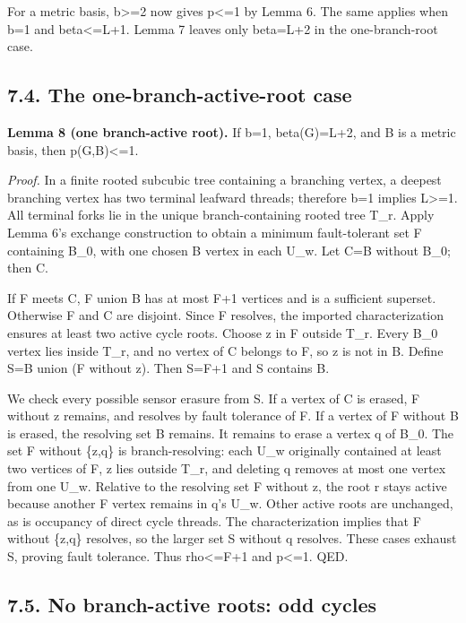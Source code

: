 \documentclass[
]{article}
\begin{document}
For a metric basis, b\textgreater=2 now gives p\textless=1 by Lemma 6.
The same applies when b=1 and beta\textless=L+1. Lemma 7 leaves only
beta=L+2 in the one-branch-root case.

\subsection{7.4. The one-branch-active-root
case}\label{the-one-branch-active-root-case}

\textbf{Lemma 8 (one branch-active root).} If b=1, beta(G)=L+2, and B is
a metric basis, then p(G,B)\textless=1.

\emph{Proof.} In a finite rooted subcubic tree containing a branching
vertex, a deepest branching vertex has two terminal leafward threads;
therefore b=1 implies L\textgreater=1. All terminal forks lie in the
unique branch-containing rooted tree T\_r. Apply Lemma 6's exchange
construction to obtain a minimum fault-tolerant set F containing B\_0,
with one chosen B vertex in each U\_w. Let C=B without B\_0; then
\textbar C.

If F meets C, F union B has at most \textbar F\textbar+1 vertices and is
a sufficient superset. Otherwise F and C are disjoint. Since F resolves,
the imported characterization ensures at least two active cycle roots.
Choose z in F outside T\_r. Every B\_0 vertex lies inside T\_r, and no
vertex of C belongs to F, so z is not in B. Define S=B union (F without
z). Then \textbar S\textbar=\textbar F\textbar+1 and S contains B.

We check every possible sensor erasure from S. If a vertex of C is
erased, F without z remains, and resolves by fault tolerance of F. If a
vertex of F without B is erased, the resolving set B remains. It remains
to erase a vertex q of B\_0. The set F without \{z,q\} is
branch-resolving: each U\_w originally contained at least two vertices
of F, z lies outside T\_r, and deleting q removes at most one vertex
from one U\_w. Relative to the resolving set F without z, the root r
stays active because another F vertex remains in q's U\_w. Other active
roots are unchanged, as is occupancy of direct cycle threads. The
characterization implies that F without \{z,q\} resolves, so the larger
set S without q resolves. These cases exhaust S, proving fault
tolerance. Thus rho\textless=\textbar F\textbar+1 and p\textless=1. QED.

\subsection{7.5. No branch-active roots: odd
cycles}\label{no-branch-active-roots-odd-cycles}
\end{document}
